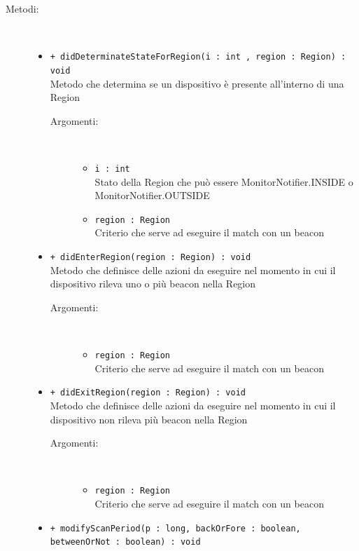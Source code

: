 \documentclass[../DefinizioneDiProdotto.tex]{subfiles}
\begin{document}
\begin{description}
\begin{itemize}
\end{itemize}
\item[Metodi:] \
\begin{itemize}
\item \texttt{+ didDeterminateStateForRegion(i : int , region : Region) : void}\\
Metodo che determina se un dispositivo è presente all'interno di una Region
 \begin{description}
\item[Argomenti:] \
\begin{itemize}
\item \texttt{i : int }\\
Stato della Region che può essere MonitorNotifier.INSIDE o MonitorNotifier.OUTSIDE\item \texttt{region : Region}\\
Criterio che serve ad eseguire il match con un beacon\end{itemize}
\end{description}
\item \texttt{+ didEnterRegion(region : Region) : void}\\
Metodo che definisce delle azioni da eseguire nel momento in cui il dispositivo rileva uno o più beacon nella Region
 \begin{description}
\item[Argomenti:] \
\begin{itemize}
\item \texttt{region : Region}\\
Criterio che serve ad eseguire il match con un beacon\end{itemize}
\end{description}
\item \texttt{+ didExitRegion(region : Region) : void}\\
Metodo che definisce delle azioni da eseguire nel momento in cui il dispositivo non rileva più beacon nella Region
 \begin{description}
\item[Argomenti:] \
\begin{itemize}
\item \texttt{region : Region}\\
Criterio che serve ad eseguire il match con un beacon\end{itemize}
\end{description}
\item \texttt{+ modifyScanPeriod(p : long, backOrFore : boolean, betweenOrNot : boolean) : void}\\

\end{itemize}
\end{description}
\end{document}
